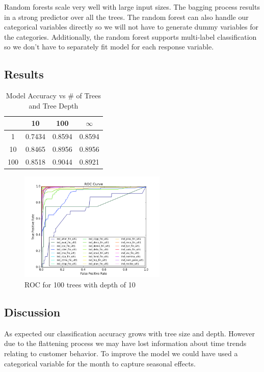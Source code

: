 \documentclass{article}
\begin{document}
\begin{spacing}{1}
\begin{large}
Random forests scale very well with large input sizes. The bagging process results in a strong predictor over all the trees. The random forest can also handle our categorical variables directly so we will not have to generate dummy variables for the categories. Additionally, the random forest supports multi-label classification so we don't have to separately fit model for each response variable.

\subsection{Results}

\begin{multicols}{2}
\begin{table}[H]
	\centering
	\begin{tabular}{|c|c|c|c|}
		\hline
		\backslashbox{Trees}{Depth} & 10 & 100 & $\infty$ \\
		\hline
		1 & 0.7434 & 0.8594  & 0.8594 \\
		10 & 0.8465 & 0.8956  & 0.8956 \\
		100 & 0.8518 & 0.9044  & 0.8921 \\
		\hline
	\end{tabular}
	\caption{Model Accuracy vs \# of Trees and Tree Depth}
	\label{tab:my_label}
\end{table}

\begin{figure}[H]
	\includegraphics[width = 7cm]{ROC.png}
	\caption{ROC for 100 trees with depth of 10}
\end{figure}


\end{multicols}

\subsection{Discussion}

As expected our classification accuracy grows with tree size and depth. However due to the flattening process we may have lost information about time trends relating to customer behavior. To improve the model we could have used a categorical variable for the month to capture seasonal effects.


\end{large}
\end{spacing}
\end{document}
